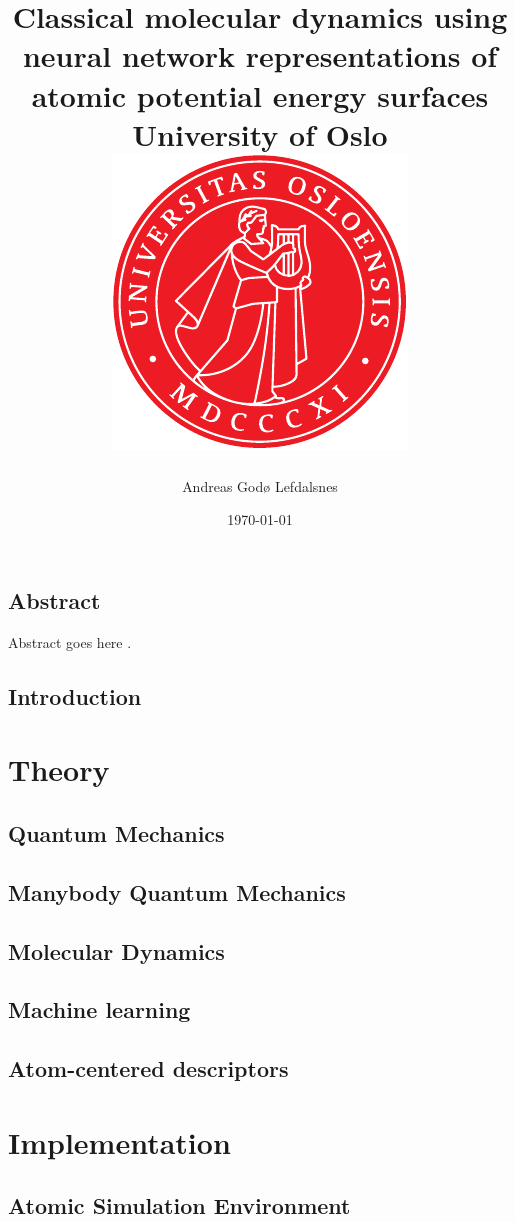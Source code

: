 \documentclass[12pt]{report}
\title{
{Classical molecular dynamics using neural network
representations of atomic potential energy surfaces}\\
{\Large University of Oslo}\\
{\includegraphics{uio.pdf}}
}
\author{Andreas Godø Lefdalsnes}
\date{\today}
\begin{document}
\maketitle

\chapter*{Abstract}
Abstract goes here \parencite[e.g.][page 300]{einstein}.

\tableofcontents

\chapter{Introduction}


\part{Theory}

\chapter{Quantum Mechanics}


\chapter{Manybody Quantum Mechanics}


\chapter{Molecular Dynamics}


\chapter{Machine learning}


\chapter{Atom-centered descriptors}


\part{Implementation}
\chapter{Atomic Simulation Environment}

\end{document}
